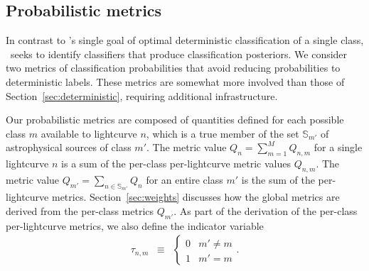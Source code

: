 

\subsection{Probabilistic metrics}
\label{sec:probabilistic}

In contrast to \snphotcc's single goal of optimal deterministic classification of a single class, \plasticc\ seeks to identify classifiers that produce classification posteriors.
We consider two metrics of classification probabilities that avoid reducing probabilities to deterministic labels.
These metrics are somewhat more involved than those of Section~\ref{sec:deterministic}, requiring additional infrastructure.

Our probabilistic metrics are composed of quantities defined for each possible class $m$ available to lightcurve $n$, which is a true member of the set $\mathbb{S}_{m'}$ of astrophysical sources of class $m'$.
The metric value $Q_{n} = \sum_{m=1}^{M} Q_{n, m}$ for a single lightcurve $n$ is a sum of the per-class per-lightcurve metric values $Q_{n, m}$.
The metric value $Q_{m'} = \sum_{n \in \mathbb{S}_{m'}} Q_{n}$ for an entire class $m'$ is the sum of the per-lightcurve metrics.
Section~\ref{sec:weights} discusses how the global metrics are derived from the per-class metrics $Q_{m'}$.
As part of the derivation of the per-class per-lightcurve metrics, we also define the indicator variable
\begin{eqnarray}
  \label{eq:indicator}
  \tau_{n, m} &\equiv& \begin{cases}
  0 & m' \neq m\\
  1 & m' = m
  \end{cases}.
\end{eqnarray}

